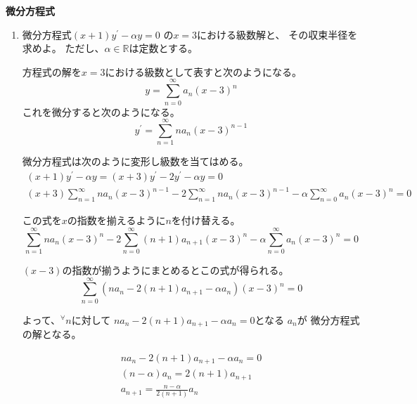 \documentclass[12pt,b5paper]{ltjsarticle}
\begin{document}
\textbf{微分方程式}

\hrulefill


\begin{enumerate}
 \item
      微分方程式$(x+1)y^{\prime}-\alpha y =0$
      の$x=3$における級数解と、
      その収束半径を求めよ。
      ただし、$\alpha\in\mathbb{R}$は定数とする。

      \dotfill


      方程式の解を$x=3$における級数として表すと次のようになる。
      \begin{equation}
       y=\sum_{n=0}^{\infty} a_n(x-3)^n
      \end{equation}
      これを微分すると次のようになる。
      \begin{equation}
       y^{\prime} = \sum_{n=1}^{\infty} na_n(x-3)^{n-1}
      \end{equation}

      微分方程式は次のように変形し級数を当てはめる。
      \begin{gather}
       (x+1)y^{\prime}-\alpha y
        =
       (x+3)y^{\prime}-2y^{\prime}-\alpha y =0\\
       (x+3)\sum_{n=1}^{\infty} na_n(x-3)^{n-1}
       -2\sum_{n=1}^{\infty} na_n(x-3)^{n-1}
       -\alpha \sum_{n=0}^{\infty} a_n(x-3)^n =0
      \end{gather}

      この式を$x$の指数を揃えるように$n$を付け替える。
      \begin{equation}
       \sum_{n=1}^{\infty} na_n(x-3)^{n}
       -2\sum_{n=0}^{\infty} (n+1)a_{n+1}(x-3)^{n}
       -\alpha \sum_{n=0}^{\infty} a_n(x-3)^n =0
      \end{equation}

      $(x-3)$の指数が揃うようにまとめるとこの式が得られる。
      \begin{equation}
       \sum_{n=0}^{\infty}(
        na_n -2 (n+1)a_{n+1} -\alpha  a_n
       )(x-3)^n =0
      \end{equation}

      よって、${}^{\forall}n$に対して
      $na_n -2 (n+1)a_{n+1} -\alpha  a_n = 0$となる
      $a_n$が
      微分方程式の解となる。

      \begin{gather}
       na_n -2 (n+1)a_{n+1} -\alpha  a_n = 0\\
       (n - \alpha)a_n = 2 (n+1)a_{n+1} \\
       a_{n+1}=\frac{n-\alpha}{2(n+1)}a_{n} \label{non}
      \end{gather}


\end{enumerate}
\end{document}

